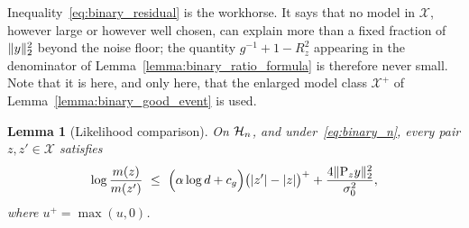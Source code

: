 \documentclass[aos]{imsart}%
\DeclarePairedDelimiter{\norm}{\lVert}{\rVert}
\DeclarePairedDelimiter{\abs}{\lvert}{\rvert}
\newcommand{\ambientspace}[0]{\mathcal{X}}
\theoremstyle{plain}
\newtheorem{lemma}[theorem]{Lemma}
\theoremstyle{definition}
\begin{document}
    Inequality~\eqref{eq:binary_residual} is the workhorse. It says that no
    model in $\ambientspace$, however large or however well chosen, can explain
    more than a fixed fraction of $\norm y_2^{2}$ beyond the noise floor; the
    quantity $g^{-1}+1-R^{2}_z$ appearing in the denominator of
    Lemma~\ref{lemma:binary_ratio_formula} is therefore never small. Note that
    it is here, and only here, that the enlarged model class
    $\ambientspace^{+}$ of Lemma~\ref{lemma:binary_good_event} is used.

    \begin{lemma}[Likelihood comparison]
        \label{lemma:binary_comparison}
        On $\mathcal{H}_n$, and under~\eqref{eq:binary_n}, every pair
        $z,z'\in\ambientspace$ satisfies
        \begin{equation}
            \label{eq:binary_comparison}
            \log\frac{m(z)}{m(z')}
            \ \leq\ \Bigl(\alpha\log d+c_g\Bigr)
            \bigl(\abs{z'}-\abs{z}\bigr)^{+}
            +\frac{4\norm{\Proj_zy}_2^{2}}{\sigma_0^{2}} ,
        \end{equation}
        where $u^{+}=\max(u,0)$.
    \end{lemma}
\end{document}
